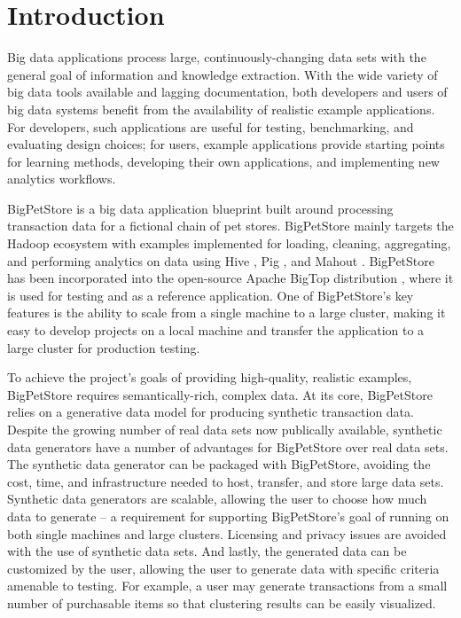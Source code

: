 \documentclass[conference]{IEEEtran}
\begin{document}
%
\IEEEpeerreviewmaketitle



\section{Introduction}
Big data applications process large, continuously-changing data sets with the general goal of information and knowledge extraction.  With the wide variety of big data tools available and lagging documentation, both developers and users of big data systems benefit from the availability of realistic example applications.  For developers, such applications are useful for testing, benchmarking, and evaluating design choices; for users, example applications provide starting points for learning methods, developing their own applications, and implementing new analytics workflows.

BigPetStore is a big data application blueprint built around processing transaction data for a fictional chain of pet stores.  BigPetStore mainly targets the Hadoop \cite{Hadoop} ecosystem with examples implemented for loading, cleaning, aggregating, and performing analytics on data using Hive \cite{Thusoo2010}, Pig \cite{Olston2008,Gates2009}, and Mahout \cite{Mahout}. BigPetStore has been incorporated into the open-source Apache BigTop distribution \cite{BigTop}, where it is used for testing and as a reference application. One of BigPetStore's key features is the ability to scale from a single machine to a large cluster, making it easy to develop projects on a local machine and transfer the application to a large cluster for production testing.

To achieve the project's goals of providing high-quality, realistic examples, BigPetStore requires semantically-rich, complex data. At its core, BigPetStore relies on a generative data model for producing synthetic transaction data. Despite the growing number of real data sets now publically available, synthetic data generators have a number of advantages for BigPetStore over real data sets. The synthetic data generator can be packaged with BigPetStore, avoiding the cost, time, and infrastructure needed to host, transfer, and store large data sets. Synthetic data generators are scalable, allowing the user to choose how much data to generate -- a requirement for supporting BigPetStore's goal of running on both single machines and large clusters.  Licensing and privacy issues are avoided with the use of synthetic data sets. And lastly, the generated data can be customized by the user, allowing the user to generate data with specific criteria amenable to testing.  For example, a user may generate transactions from a small number of purchasable items so that clustering results can be easily visualized.
\end{document}
